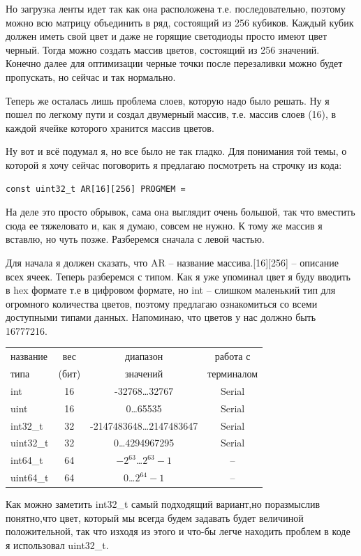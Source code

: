 \documentclass[a4paper, 12pt]{article}
\begin{document}

Но загрузка ленты идет так как она расположена т.е. последовательно, поэтому
можно всю матрицу объединить в ряд, состоящий из 256 кубиков. Каждый кубик
должен иметь свой цвет и даже не горящие светодиоды просто имеют цвет черный. 
Тогда можно создать массив цветов, состоящий из 256 значений. 
Конечно далее для оптимизации черные точки после перезаливки можно будет 
пропускать, но сейчас и так нормально.

Теперь же осталась лишь проблема слоев, которую надо было решать. Ну я пошел
по легкому пути и создал двумерный массив, т.е. массив слоев (16), в каждой
ячейке которого хранится массив цветов.


Ну вот и всё подумал я, но все было не так гладко. Для понимания той темы, о
которой я хочу сейчас поговорить я предлагаю посмотреть на строчку из кода:
\begin{lstlisting}[style=myLatexStyle]
const uint32_t AR[16][256] PROGMEM = 
\end{lstlisting}

На деле это просто обрывок, сама она выглядит очень большой, так что вместить
сюда ее тяжеловато и, как я думаю, совсем не нужно. К тому же массив я вставлю,
но чуть позже. Разберемся сначала с левой частью. 

Для начала я должен сказать, что AR -- название массива.[16][256] -- описание 
всех ячеек. Теперь разберемся с типом. Как я уже упоминал цвет я буду вводить
в hex формате т.е в цифровом формате, но int -- слишком маленький тип для 
огромного количества цветов, поэтому предлагаю ознакомиться со всеми доступными
типами данных. Напоминаю, что цветов у нас должно быть 16777216.

\begin{center}
\begin{tabular}{|l|c|c|c|}
\hline
название&вес&диапазон&работа с\\
типа&(бит)&значений&терминалом\\
\hline
int&16 &-32768\dots32767&Serial\\
\hline
uint&16 &0\dots65535&Serial\\
\hline
int32\_t&32 &-2147483648\dots2147483647&Serial\\
\hline
uint32\_t&32 &0\dots4294967295&Serial\\
\hline
int64\_t&64 &$-2^{63}$\dots$2^{63}-1$&--\\
\hline
uint64\_t&64 &0\dots$2^{64}-1$&--\\
\hline
\end{tabular}
\end{center}
Как можно заметить int32\_t самый подходящий вариант,но поразмыслив понятно,что
цвет, который мы всегда будем задавать будет величиной положительной, так что
изходя из этого и что-бы легче находить проблем в коде я использовал uint32\_t.
\end{document}
